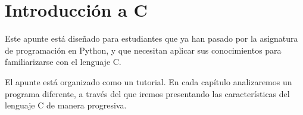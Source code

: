 \section{Introducción a C}

Este apunte está diseñado para estudiantes que ya han pasado por la
asignatura de programación en Python, y que necesitan aplicar sus
conocimientos para familiarizarse con el lenguaje C.

El apunte está organizado como un tutorial. En cada capítulo
analizaremos un programa diferente, a través del que iremos presentando
las características del lenguaje C de manera progresiva.
